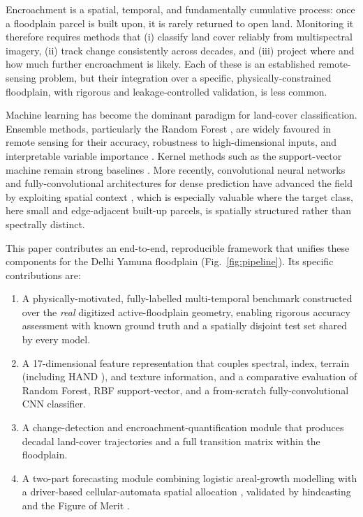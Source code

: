 \documentclass[journal]{IEEEtran}
\begin{document}
Encroachment is a spatial, temporal, and fundamentally cumulative process: once a floodplain parcel is built upon, it is rarely returned to open land. Monitoring it therefore requires methods that (i) classify land cover reliably from multispectral imagery, (ii) track change consistently across decades, and (iii) project where and how much further encroachment is likely. Each of these is an established remote-sensing problem, but their integration over a specific, physically-constrained floodplain, with rigorous and leakage-controlled validation, is less common.

Machine learning has become the dominant paradigm for land-cover classification. Ensemble methods, particularly the Random Forest \cite{breiman2001random}, are widely favoured in remote sensing for their accuracy, robustness to high-dimensional inputs, and interpretable variable importance \cite{belgiu2016random,gislason2006random,pal2005random}. Kernel methods such as the support-vector machine \cite{cortes1995svm} remain strong baselines \cite{maxwell2018implementation}. More recently, convolutional neural networks \cite{lecun2015deep,krizhevsky2012imagenet,he2016deep} and fully-convolutional architectures for dense prediction \cite{long2015fully,ronneberger2015unet} have advanced the field by exploiting spatial context \cite{zhu2017deep,ma2019deep,kussul2017deep}, which is especially valuable where the target class, here small and edge-adjacent built-up parcels, is spatially structured rather than spectrally distinct.

This paper contributes an end-to-end, reproducible framework that unifies these components for the Delhi Yamuna floodplain (Fig.~\ref{fig:pipeline}). Its specific contributions are:
\begin{enumerate}
\item A physically-motivated, fully-labelled multi-temporal benchmark constructed over the \emph{real} digitized active-floodplain geometry, enabling rigorous accuracy assessment with known ground truth and a spatially disjoint test set shared by every model.
\item A 17-dimensional feature representation that couples spectral, index, terrain (including HAND \cite{renno2008hand,nobre2011height}), and texture information, and a comparative evaluation of Random Forest, RBF support-vector, and a from-scratch fully-convolutional CNN classifier.
\item A change-detection and encroachment-quantification module that produces decadal land-cover trajectories and a full transition matrix within the floodplain.
\item A two-part forecasting module combining logistic areal-growth modelling with a driver-based cellular-automata spatial allocation \cite{yang2014markov,verburg2002clue}, validated by hindcasting and the Figure of Merit \cite{pontius2008comparing}.
\end{enumerate}
\end{document}
